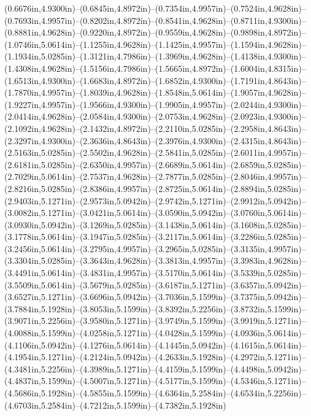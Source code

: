 (0.6676in,4.9300in)--(0.6845in,4.8972in)--(0.7354in,4.9957in)--(0.7524in,4.9628in)--(0.7693in,4.9957in)--(0.8202in,4.8972in)--(0.8541in,4.9628in)--(0.8711in,4.9300in)--(0.8881in,4.9628in)--(0.9220in,4.8972in)--(0.9559in,4.9628in)--(0.9898in,4.8972in)--(1.0746in,5.0614in)--(1.1255in,4.9628in)--(1.1425in,4.9957in)--(1.1594in,4.9628in)--(1.1934in,5.0285in)--(1.3121in,4.7986in)--(1.3969in,4.9628in)--(1.4138in,4.9300in)--(1.4308in,4.9628in)--(1.5156in,4.7986in)--(1.5665in,4.8972in)--(1.6004in,4.8315in)--(1.6513in,4.9300in)--(1.6683in,4.8972in)--(1.6852in,4.9300in)--(1.7191in,4.8643in)--(1.7870in,4.9957in)--(1.8039in,4.9628in)--(1.8548in,5.0614in)--(1.9057in,4.9628in)--(1.9227in,4.9957in)--(1.9566in,4.9300in)--(1.9905in,4.9957in)--(2.0244in,4.9300in)--(2.0414in,4.9628in)--(2.0584in,4.9300in)--(2.0753in,4.9628in)--(2.0923in,4.9300in)--(2.1092in,4.9628in)--(2.1432in,4.8972in)--(2.2110in,5.0285in)--(2.2958in,4.8643in)--(2.3297in,4.9300in)--(2.3636in,4.8643in)--(2.3976in,4.9300in)--(2.4315in,4.8643in)--(2.5163in,5.0285in)--(2.5502in,4.9628in)--(2.5841in,5.0285in)--(2.6011in,4.9957in)--(2.6181in,5.0285in)--(2.6350in,4.9957in)--(2.6689in,5.0614in)--(2.6859in,5.0285in)--(2.7029in,5.0614in)--(2.7537in,4.9628in)--(2.7877in,5.0285in)--(2.8046in,4.9957in)--(2.8216in,5.0285in)--(2.8386in,4.9957in)--(2.8725in,5.0614in)--(2.8894in,5.0285in)--(2.9403in,5.1271in)--(2.9573in,5.0942in)--(2.9742in,5.1271in)--(2.9912in,5.0942in)--(3.0082in,5.1271in)--(3.0421in,5.0614in)--(3.0590in,5.0942in)--(3.0760in,5.0614in)--(3.0930in,5.0942in)--(3.1269in,5.0285in)--(3.1438in,5.0614in)--(3.1608in,5.0285in)--(3.1778in,5.0614in)--(3.1947in,5.0285in)--(3.2117in,5.0614in)--(3.2286in,5.0285in)--(3.2456in,5.0614in)--(3.2795in,4.9957in)--(3.2965in,5.0285in)--(3.3135in,4.9957in)--(3.3304in,5.0285in)--(3.3643in,4.9628in)--(3.3813in,4.9957in)--(3.3983in,4.9628in)--(3.4491in,5.0614in)--(3.4831in,4.9957in)--(3.5170in,5.0614in)--(3.5339in,5.0285in)--(3.5509in,5.0614in)--(3.5679in,5.0285in)--(3.6187in,5.1271in)--(3.6357in,5.0942in)--(3.6527in,5.1271in)--(3.6696in,5.0942in)--(3.7036in,5.1599in)--(3.7375in,5.0942in)--(3.7884in,5.1928in)--(3.8053in,5.1599in)--(3.8392in,5.2256in)--(3.8732in,5.1599in)--(3.9071in,5.2256in)--(3.9580in,5.1271in)--(3.9749in,5.1599in)--(3.9919in,5.1271in)--(4.0088in,5.1599in)--(4.0258in,5.1271in)--(4.0428in,5.1599in)--(4.0936in,5.0614in)--(4.1106in,5.0942in)--(4.1276in,5.0614in)--(4.1445in,5.0942in)--(4.1615in,5.0614in)--(4.1954in,5.1271in)--(4.2124in,5.0942in)--(4.2633in,5.1928in)--(4.2972in,5.1271in)--(4.3481in,5.2256in)--(4.3989in,5.1271in)--(4.4159in,5.1599in)--(4.4498in,5.0942in)--(4.4837in,5.1599in)--(4.5007in,5.1271in)--(4.5177in,5.1599in)--(4.5346in,5.1271in)--(4.5686in,5.1928in)--(4.5855in,5.1599in)--(4.6364in,5.2584in)--(4.6534in,5.2256in)--(4.6703in,5.2584in)--(4.7212in,5.1599in)--(4.7382in,5.1928in) 